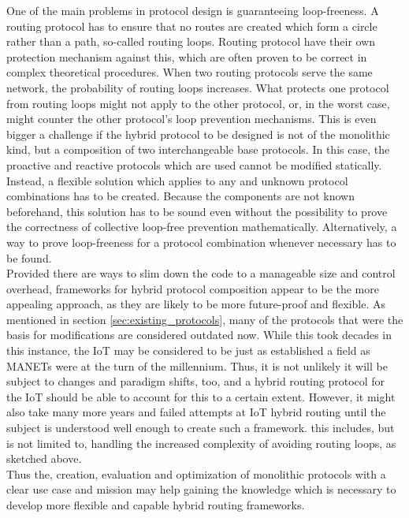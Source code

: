 \documentclass[a4paper,10pt]{scrartcl}
\begin{document}
One of the main problems in protocol design is guaranteeing loop-freeness. A routing protocol has to ensure that no routes are created which form a circle rather than a path, so-called routing loops. Routing protocol have their own protection mechanism against this, which are often proven to be correct in complex theoretical procedures. When two routing protocols serve the same network, the probability of routing loops increases. What protects one protocol from routing loops might not apply to the other protocol, or, in the worst case, might counter the other protocol's loop prevention mechanisms. This is even bigger a challenge if the hybrid protocol to be designed is not of the monolithic kind, but a composition of two interchangeable base protocols. In this case, the proactive and reactive protocols which are used cannot be modified statically. Instead, a flexible solution which applies to any and unknown protocol combinations has to be created. Because the components are not known beforehand, this solution has to be sound even without the possibility to prove the correctness of collective loop-free prevention mathematically. Alternatively, a way to prove loop-freeness for a protocol combination whenever necessary has to be found.\\

Provided there are ways to slim down the code to a manageable size and control overhead, frameworks for hybrid protocol composition appear to be the more appealing approach, as they are likely to be more future-proof and flexible. As mentioned in section \ref{sec:existing_protocols}, many of the protocols that were the basis for modifications are considered outdated now. While this took decades in this instance, the IoT may be considered to be just as established a field as MANETs were at the turn of the millennium. Thus, it is not unlikely it will be subject to changes and paradigm shifts, too, and a hybrid routing protocol for the IoT should be able to account for this to a certain extent. However, it might also take many more years and failed attempts at IoT hybrid routing until the subject is understood well enough to create such a framework. this includes, but is not limited to, handling the increased complexity of avoiding routing loops, as sketched above.\\

Thus the, creation, evaluation and optimization of monolithic protocols with a clear use case and mission may help gaining the knowledge which is necessary to develop more flexible and capable hybrid routing frameworks.
\end{document}
